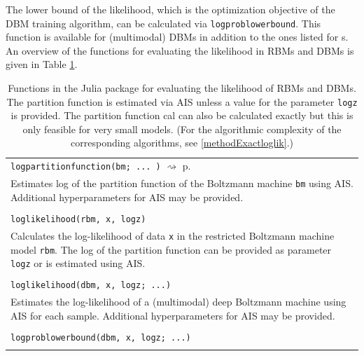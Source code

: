\documentclass[12pt]{article}
\newcommand{\inlinecode}[1]{\texttt{#1}}
\newcommand{\rightpageref}[1]{\hfill $\rightsquigarrow$ p.\ \pageref{#1}}
\begin{document}
The lower bound of the likelihood, which is the optimization objective of the DBM training algorithm, can be calculated via \inlinecode{logproblowerbound}.
This function is available for (multimodal) DBMs in addition to the ones listed for s.
An overview of the functions for evaluating the likelihood in RBMs and DBMs is given in Table \ref{juliaFunTableEval}.



\begin{table}[h]
\caption{Functions in the Julia package for evaluating the likelihood of RBMs and DBMs. The partition function is estimated via AIS unless a value for the parameter \inlinecode{logz} is provided. The partition function cal can also be calculated exactly but this is only feasible for very small models. (For the algorithmic complexity of the corresponding algorithms, see \ref{methodExactloglik}.) }
\label{juliaFunTableEval}
   \begin{tabularx}{\textwidth}{X}
 \Xhline{1pt}
   \inlinecode{logpartitionfunction(bm; ... )} \rightpageref{bms_logpartitionfunction}\\
   Estimates log of the partition function of the Boltzmann machine \inlinecode{bm} using AIS. Additional hyperparameters for AIS may be provided. \\
   \makecell[tl]{
      \inlinecode{loglikelihood(rbm, x)} \\
      \inlinecode{loglikelihood(rbm, x, logz)}
   } \rightpageref{bms_loglikelihood} \\
   Calculates the log-likelihood of data \inlinecode{x} in the restricted Boltzmann machine model \inlinecode{rbm}. The log of the partition function can be provided as parameter \inlinecode{logz} or is estimated using AIS. \\
   \makecell[tl]{
      \inlinecode{loglikelihood(dbm, x; ...)} \\
      \inlinecode{loglikelihood(dbm, x, logz; ...)}
   } \rightpageref{bms_loglikelihood} \\
   Estimates the log-likelihood of a (multimodal) deep Boltzmann machine using AIS for each sample. Additional hyperparameters for AIS may be provided. \\
   \makecell[tl]{
   	\inlinecode{logproblowerbound(dbm, x; ...)} \\
   	   	\inlinecode{logproblowerbound(dbm, x, logz; ...)} \\
   	} \rightpageref{bms_logproblowerbound} \\

\end{tabularx}
\end{table}
\end{document}
